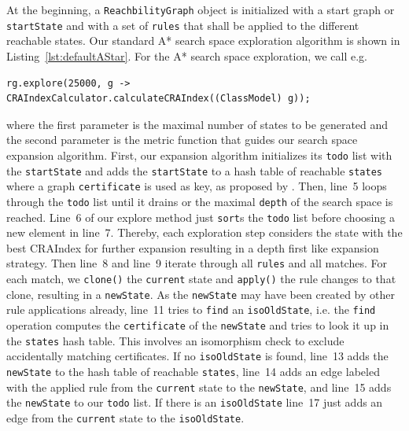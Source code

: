 \documentclass[a4paper]{article}
\begin{document}
At the beginning, a \texttt{ReachbilityGraph} object is initialized with a 
start graph or \texttt{startState} and with a set of \texttt{rules} that 
shall be applied to the different reachable states. Our standard A* search space 
exploration algorithm is shown in 
Listing~\ref{lst:defaultAStar}. For the A* search space 
exploration, we call e.g.
\begin{verbatim}
rg.explore(25000, g -> CRAIndexCalculator.calculateCRAIndex((ClassModel) g));
\end{verbatim}
where the first parameter is the maximal number of 
states to be generated and the second parameter is the metric function that guides
our search space expansion algorithm. First, our expansion algorithm initializes 
its \texttt{todo} list with the \texttt{startState} and adds the 
\texttt{startState} to a hash table of reachable \texttt{states} where 
a graph \texttt{certificate} is used as key, as proposed by \cite{rensink2003groove}.
Then, line~5 loops through the \texttt{todo} list until it drains or the maximal 
\texttt{depth} of the search space is reached. 
Line~6 of our explore method just \texttt{sort}s the \texttt{todo} list before choosing 
a new element in line~7. Thereby, each exploration step considers the state with the best 
CRAIndex for further expansion resulting in a depth first like expansion strategy. 
Then line~8 and line~9 iterate through all \texttt{rules} and all matches. 
For each match, we \texttt{clone()} the \texttt{current} state and \texttt{apply()} the 
rule changes to that clone, resulting in a \texttt{newState}. As the \texttt{newState}
may have been created by other rule applications already, line~11 tries to \texttt{find} 
an \texttt{isoOldState}, i.e. the \texttt{find}  operation computes the 
\texttt{certificate} of the \texttt{newState} and tries to look it up in the 
\texttt{states} hash table. This involves an isomorphism check to exclude accidentally 
matching certificates. If no \texttt{isoOldState} is found, line~13 adds the 
\texttt{newState} to the hash table of reachable \texttt{states}, line~14 adds an edge
labeled with the applied rule from the \texttt{current} state to the \texttt{newState}, 
and line~15 adds the \texttt{newState} to our \texttt{todo} list. If there is an 
\texttt{isoOldState} line~17 just adds an edge from the \texttt{current} state to the 
\texttt{isoOldState}.
\end{document}

